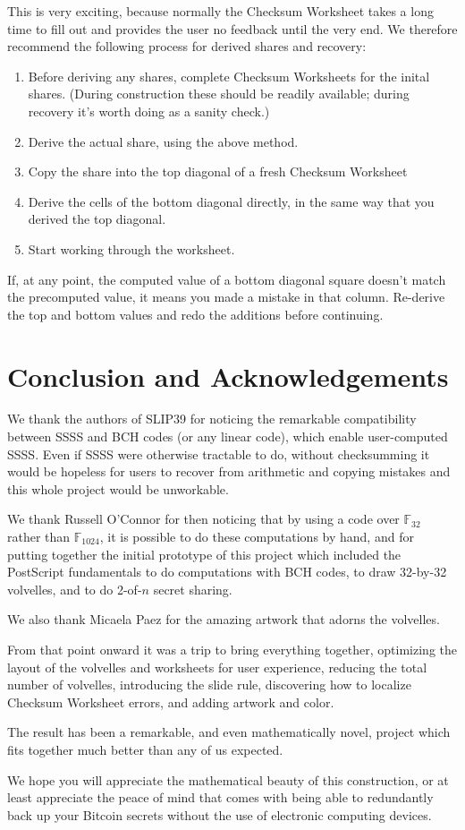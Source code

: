 \documentclass[letterpaper]{article}
\theoremstyle{xxx}
\theoremstyle{evil}
\theoremstyle{yyy}
\theoremstyle{plain}
\theoremstyle{zzz}
\newcommand{\fttwo}{\mathbb{F}_{32}}
\begin{document}
This is very exciting, because normally the Checksum Worksheet takes a long time
to fill out and provides the user no feedback until the very end. We therefore
recommend the following process for derived shares and recovery:
\begin{enumerate}
\item Before deriving any shares, complete Checksum Worksheets for the inital
shares. (During construction these should be readily available; during recovery
it's worth doing as a sanity check.)
\item Derive the actual share, using the above method.
\item Copy the share into the top diagonal of a fresh Checksum Worksheet
\item Derive the cells of the bottom diagonal directly, in the same way that
you derived the top diagonal.
\item Start working through the worksheet.
\end{enumerate}

If, at any point, the computed value of a bottom diagonal square doesn't match
the precomputed value, it means you made a mistake in that column. Re-derive the
top and bottom values and redo the additions before continuing.

\section{Conclusion and Acknowledgements}

We thank the authors of SLIP39 for noticing the remarkable compatibility between
SSSS and BCH codes (or any linear code), which enable user-computed SSSS. Even if
SSSS were otherwise tractable to do, without checksumming it would be hopeless
for users to recover from arithmetic and copying mistakes and this whole project
would be unworkable.

We thank Russell O'Connor for then noticing that by using a code over $\fttwo$
rather than $\mathbb{F}_{1024}$, it is possible to do these computations by hand,
and for putting together the initial prototype of this project which included
the PostScript fundamentals to do computations with BCH codes, to draw 32-by-32
volvelles, and to do 2-of-$n$ secret sharing.

We also thank Micaela Paez for the amazing artwork that adorns the volvelles.

From that point onward it was a trip to bring everything together, optimizing
the layout of the volvelles and worksheets for user experience, reducing the
total number of volvelles, introducing the slide rule, discovering how to localize
Checksum Worksheet errors, and adding artwork and color.

The result has been a remarkable, and even mathematically novel, project which
fits together much better than any of us expected.

We hope you will appreciate the mathematical beauty of this construction, or
at least appreciate the peace of mind that comes with being able to redundantly
back up your Bitcoin secrets without the use of electronic computing devices.
\end{document}
